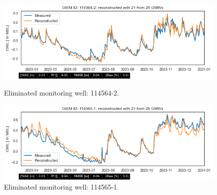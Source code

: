\begin{figure}[h]
    \centering
    \begin{minipage}{0.48\textwidth}
        \centering
        \includegraphics[width=\linewidth]{frontmatter/Rozenburg-fig/1145642.png}
        \caption{Eliminated monitoring well: 114564-2.}
        \label{roz1}
    \end{minipage}\hfill
    \begin{minipage}{0.48\textwidth}
        \centering
        \includegraphics[width=\linewidth]{frontmatter/Rozenburg-fig/1145651.png}
        \caption{Eliminated monitoring well: 114565-1. }
        \label{114565-1}
    \end{minipage}
    

\end{figure}
